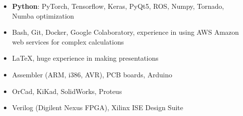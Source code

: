 \begin{itemize}
    \item \textbf{Python}: PyTorch, Tensorflow, Keras, PyQt5, ROS, Numpy, Tornado, Numba optimization
    
    
    \item Bash, Git, Docker, Google Colaboratory, experience in using AWS Amazon web services for complex calculations
    
    \item \LaTeX, huge experience in making presentations
    
\end{itemize}

\newpage

\begin{itemize}
    \item Assembler (ARM, i386, AVR), PCB boards, Arduino
    \item OrCad, KiKad, SolidWorks, Proteus
    \item Verilog (Digilent Nexus FPGA), Xilinx ISE Design Suite
\end{itemize}


